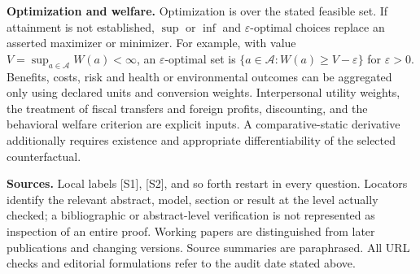 \documentclass[11pt,a4paper]{article}
\begin{document}
\textbf{Optimization and welfare.} Optimization is over the stated feasible set. If attainment is not established, $\sup$ or $\inf$ and $\varepsilon$-optimal choices replace an asserted maximizer or minimizer. For example, with value $V=\sup_{a\in\mathcal A}W(a)<\infty$, an $\varepsilon$-optimal set is $\{a\in\mathcal A:W(a)\geq V-\varepsilon\}$ for $\varepsilon>0$. Benefits, costs, risk and health or environmental outcomes can be aggregated only using declared units and conversion weights. Interpersonal utility weights, the treatment of fiscal transfers and foreign profits, discounting, and the behavioral welfare criterion are explicit inputs. A comparative-static derivative additionally requires existence and appropriate differentiability of the selected counterfactual.

\textbf{Sources.} Local labels [S1], [S2], and so forth restart in every question. Locators identify the relevant abstract, model, section or result at the level actually checked; a bibliographic or abstract-level verification is not represented as inspection of an entire proof. Working papers are distinguished from later publications and changing versions. Source summaries are paraphrased. All URL checks and editorial formulations refer to the audit date stated above.
\end{document}
